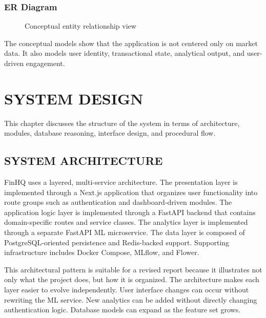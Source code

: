 \documentclass[12pt,a4paper]{report}
\newcommand{\projectshort}{FinHQ}
\begin{document}
\subsection{ER Diagram}
\begin{figure}[H]
\centering
{}
\caption{Conceptual entity relationship view}
\end{figure}

The conceptual models show that the application is not centered only on market data. It also models user identity, transactional state, analytical output, and user-driven engagement.

\chapter{SYSTEM DESIGN}
This chapter discusses the structure of the system in terms of architecture, modules, database reasoning, interface design, and procedural flow.

\section{SYSTEM ARCHITECTURE}
\projectshort{} uses a layered, multi-service architecture. The presentation layer is implemented through a Next.js application that organizes user functionality into route groups such as authentication and dashboard-driven modules. The application logic layer is implemented through a FastAPI backend that contains domain-specific routes and service classes. The analytics layer is implemented through a separate FastAPI ML microservice. The data layer is composed of PostgreSQL-oriented persistence and Redis-backed support. Supporting infrastructure includes Docker Compose, MLflow, and Flower.

This architectural pattern is suitable for a revised report because it illustrates not only what the project does, but how it is organized. The architecture makes each layer easier to evolve independently. User interface changes can occur without rewriting the ML service. New analytics can be added without directly changing authentication logic. Database models can expand as the feature set grows.
\end{document}
